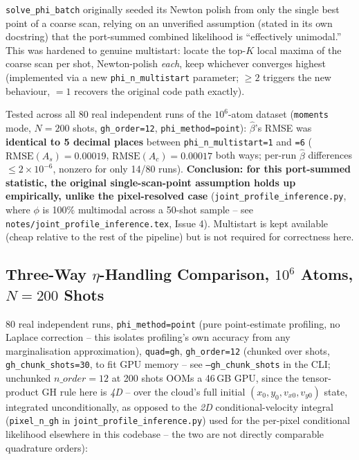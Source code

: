 \documentclass[11pt,a4paper]{article}
\begin{document}
\texttt{solve\_phi\_batch} originally seeded its Newton polish from only the
single best point of a coarse scan, relying on an unverified assumption
(stated in its own docstring) that the port-summed combined likelihood is
``effectively unimodal.'' This was hardened to genuine multistart: locate the
top-$K$ local maxima of the coarse scan per shot, Newton-polish \emph{each},
keep whichever converges highest (implemented via a new
\texttt{phi\_n\_multistart} parameter; $\ge 2$ triggers the new behaviour,
$=1$ recovers the original code path exactly).

Tested across all 80 real independent runs of the $10^6$-atom dataset
(\texttt{moments} mode, $N=200$ shots, \texttt{gh\_order=12},
\texttt{phi\_method=point}): $\hat\beta$'s RMSE was \textbf{identical to 5
decimal places} between \texttt{phi\_n\_multistart=1} and \texttt{=6}
($\mathrm{RMSE}(A_s)=0.00019$, $\mathrm{RMSE}(A_c)=0.00017$ both ways;
per-run $\hat\beta$ differences $\le 2\times10^{-6}$, nonzero for only 14/80
runs). \textbf{Conclusion: for this port-summed statistic, the original
single-scan-point assumption holds up empirically, unlike the
pixel-resolved case} (\texttt{joint\_profile\_inference.py}, where $\phi$ is
100\% multimodal across a 50-shot sample -- see
\texttt{notes/joint\_profile\_inference.tex}, Issue 4). Multistart is kept
available (cheap relative to the rest of the pipeline) but is not required
for correctness here.

\subsection{Three-Way $\eta$-Handling Comparison, $10^6$ Atoms, $N=200$ Shots}

80 real independent runs, \texttt{phi\_method=point} (pure point-estimate
profiling, no Laplace correction -- this isolates profiling's own accuracy
from any marginalisation approximation), \texttt{quad=gh},
\texttt{gh\_order=12} (chunked over shots, \texttt{gh\_chunk\_shots=30}, to
fit GPU memory -- see \texttt{--gh\_chunk\_shots} in the CLI; unchunked
$n\_order{=}12$ at 200 shots OOMs a 46\,GB GPU, since the tensor-product GH
rule here is \emph{4D} -- over the cloud's full initial
$(x_0,y_0,v_{x0},v_{y0})$ state, integrated unconditionally, as opposed to
the \emph{2D} conditional-velocity integral (\texttt{pixel\_n\_gh} in
\texttt{joint\_profile\_inference.py}) used for the per-pixel conditional
likelihood elsewhere in this codebase -- the two are not directly comparable
quadrature orders):
\end{document}
